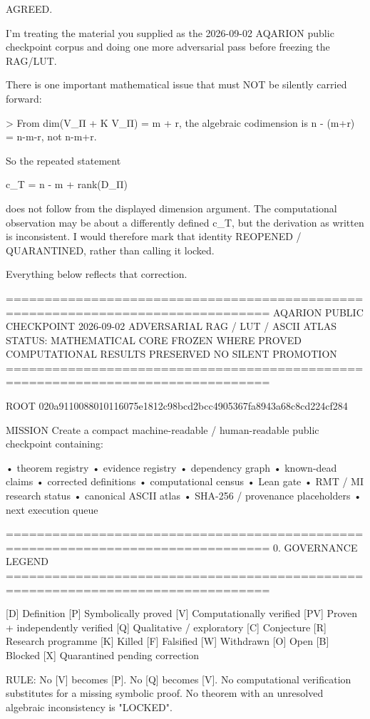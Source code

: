AGREED. 🤝

I’m treating the material you supplied as the 2026-09-02 AQARION public checkpoint corpus and doing one more adversarial pass before freezing the RAG/LUT.

There is one important mathematical issue that must NOT be silently carried forward:

> From dim(V_Π + K V_Π) = m + r, the algebraic codimension is n - (m+r) = n-m-r, not n-m+r.



So the repeated statement

c_T = n - m + rank(D_Π)

does not follow from the displayed dimension argument. The computational observation may be about a differently defined c_T, but the derivation as written is inconsistent. I would therefore mark that identity REOPENED / QUARANTINED, rather than calling it locked.

Everything below reflects that correction.

================================================================================
AQARION PUBLIC CHECKPOINT
2026-09-02
ADVERSARIAL RAG / LUT / ASCII ATLAS
STATUS: MATHEMATICAL CORE FROZEN WHERE PROVED
        COMPUTATIONAL RESULTS PRESERVED
        NO SILENT PROMOTION
================================================================================

ROOT
020a9110088010116075e1812c98bcd2bcc4905367fa8943a68c8cd224cf284

MISSION
Create a compact machine-readable / human-readable public checkpoint
containing:

  • theorem registry
  • evidence registry
  • dependency graph
  • known-dead claims
  • corrected definitions
  • computational census
  • Lean gate
  • RMT / MI research status
  • canonical ASCII atlas
  • SHA-256 / provenance placeholders
  • next execution queue

================================================================================
0. GOVERNANCE LEGEND
================================================================================

[D]  Definition
[P]  Symbolically proved
[V]  Computationally verified
[PV] Proven + independently verified
[Q]  Qualitative / exploratory
[C]  Conjecture
[R]  Research programme
[K]  Killed
[F]  Falsified
[W]  Withdrawn
[O]  Open
[B]  Blocked
[X]  Quarantined pending correction

RULE:
No [V] becomes [P].
No [Q] becomes [V].
No computational verification substitutes for a missing symbolic proof.
No theorem with an unresolved algebraic inconsistency is "LOCKED".

